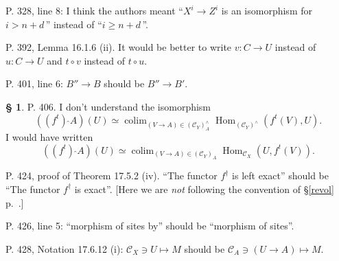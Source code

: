 \documentclass[12pt]{article}
\theoremstyle{remark}
\theoremstyle{definition}
\newtheorem{s}[thm]{\S}
\newcommand{\C}{\mathcal C}
\DeclareMathOperator*{\co}{colim}
\DeclareMathOperator{\Hom}{Hom}%
\begin{document}
\noindent P. 328, line 8: I think the authors meant ``$X^i\to Z^i$ is an isomorphism for $i>n+d\,$'' instead of ``$i\ge n+d\,$''. 

\noindent P. 392, Lemma 16.1.6 (ii). It would be better to write $v:C\to U$ instead of $u:C\to U$ and $t\circ v$ instead of $t\circ u$. 

\noindent P. 401, line 6: $B''\to B$ should be $B''\to B'$.
%
\begin{s}\label{c406}
P. 406. I don't understand the isomorphism 
$$
\left((f^t)\ \widehat{}A\right)(U)\simeq\co_{(V\to A)\in(\C_Y)_A^\wedge}\Hom_{(\C_Y)^\wedge}(f^t(V),U).
$$ 
I would have written 
$$
\left((f^t)\ \widehat{}A\right)(U)\simeq\co_{(V\to A)\in(\C_Y)_A}\Hom_{\C_X}(U,f^t(V)).
$$
\end{s}
%
\noindent P. 424, proof of Theorem 17.5.2 (iv). ``The functor $f^\dagger$ is left exact'' should be ``The functor $f^\dagger$ is exact''. [Here we are {\em not} following the convention of \S\ref{revol} p.~\pageref{revol}.]

\noindent P. 426, line 5: ``morphism of sites by'' should be ``morphism of sites''.

\noindent P. 428, Notation 17.6.12 (i): $\C_X\ni U\mapsto M$ should be $\C_A\ni(U\to A)\mapsto M$.
%
\end{document}
